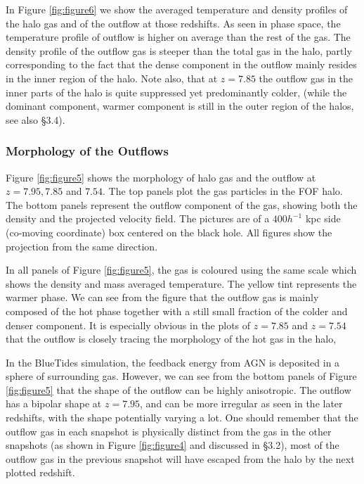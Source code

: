 \documentclass[a4paper,usenatbib]{mnras}
\begin{document}
In Figure \ref{fig:figure6} we show
the averaged temperature and density profiles of the halo gas and of the outflow at those redshifts. As seen in phase space, the temperature profile of outflow is higher on average than the rest of the gas.
The density profile of the outflow gas is steeper than the total gas in the halo, partly corresponding to the fact that the dense component in the outflow mainly resides in the inner region of the halo. 
Note also, that at $z=7.85$ the outflow gas in the inner parts of the halo is quite suppressed yet predominantly colder, (while the dominant component, warmer component is still in the outer region of the halos, see also \S 3.4). 


\subsubsection{Morphology of the Outflows}
Figure \ref{fig:figure5} shows the morphology of halo gas and the outflow at $z=7.95,7.85$ and $7.54$. 
The top panels plot the gas particles in the FOF halo. 
The bottom panels represent the outflow component of the gas, showing both the density and the projected velocity field. 
The pictures are of a $400h^{-1}$ kpc side (co-moving coordinate) box centered on the black hole. 
All figures show the projection from the same direction.

In all panels of Figure \ref{fig:figure5}, the gas is coloured using the same scale which shows the density and mass averaged temperature. The yellow tint represents the warmer phase. We can see from the figure that the outflow gas is mainly composed of the hot phase together with a still small fraction of the colder and denser component. It is especially obvious in the plots of $z=7.85$ and $z=7.54$ that the outflow is closely tracing the morphology of the hot gas in the halo,

In the BlueTides simulation, the feedback energy from AGN is deposited in a sphere of surrounding gas.
However, we can see from the bottom panels of Figure \ref{fig:figure5} that the shape of the outflow can be highly anisotropic. 
The outflow has a bipolar shape at $z=7.95$, and can be more irregular as seen in the later redshifts, with the shape potentially varying a lot. One should remember that the outflow gas in each snapshot is physically distinct from the gas in the other snapshots (as shown in Figure \ref{fig:figure4} and discussed in \S 3.2), most of the outflow gas in the previous snapshot will have escaped from the halo by the next plotted redshift. 
\end{document}
